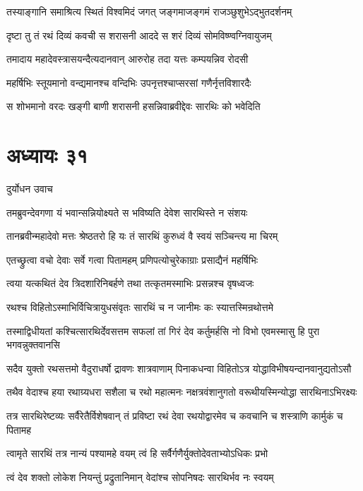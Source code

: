 \twolineshloka
{तस्याङ्गानि समाश्रित्य स्थितं विश्वमिदं जगत्}
{जङ्गमाजङ्गमं राजञ्छुशुभेऽद्भुतदर्शनम्}


\twolineshloka
{दृष्टा तु तं रथं दिव्यं कवची स शरासनी}
{आददे स शरं दिव्यं सोमविष्ण्वग्निवायुजम्}


\twolineshloka
{तमादाय महादेवस्त्रासयन्दैत्यदानवान्}
{आरुरोह तदा यत्तः कम्पयन्निव रोदसी}


\twolineshloka
{महर्षिभिः स्तूयमानो वन्द्यमानश्च वन्दिभिः}
{उपनृत्तश्चाप्सरसां गणैर्नृत्तविशारदैः}


\twolineshloka
{स शोभमानो वरदः खङ्गी बाणी शरासनी}
{हसन्निवाब्रवीद्देवः सारथिः को भवेदिति}


\chapter{अध्यायः ३१}
\twolineshloka
{दुर्योधन उवाच}
{}


\twolineshloka
{तमब्रुवन्देवगणा यं भवान्सन्नियोक्ष्यते}
{स भविष्यति देवेश सारथिस्ते न संशयः}


\twolineshloka
{तानब्रवीन्महादेवो मत्तः श्रेष्ठतरो हि यः}
{तं सारथिं कुरुध्वं वै स्वयं सञ्चिन्त्य मा चिरम्}


\twolineshloka
{एतच्छ्रुत्वा वचो देवाः सर्वे गत्वा पितामहम्}
{प्रणिपत्योचुरेकाग्राः प्रसाद्यैनं महर्षिभिः}


\twolineshloka
{त्वया यत्कथितं देव त्रिदशारिनिबर्हणे}
{तथा तत्कृतमस्माभिः प्रसन्नश्च वृषध्वजः}


\twolineshloka
{रथश्च विहितोऽस्माभिर्विचित्रायुधसंवृतः}
{सारथिं च न जानीमः कः स्यात्तस्मिन्रथोत्तमे}


\threelineshloka
{तस्माद्विधीयतां कश्चित्सारथिर्देवसत्तम}
{सफलां तां गिरं देव कर्तुमर्हसि नो विभो}
{एवमस्मासु हि पुरा भगवन्नुक्तवानसि}


\twolineshloka
{सदैव युक्तो रथसत्तमो वैदुराधर्षो द्रावणः शात्रवाणाम्}
{पिनाकधन्वा विहितोऽत्र योद्धाविभीषयन्दानवानुद्यतोऽसौ}


\twolineshloka
{तथैव वेदाश्च हया रथाग्र्यधरा सशैला च रथो महात्मनः}
{नक्षत्रवंशानुगतो वरूथीयस्मिन्योद्धा सारथिनाऽभिरक्ष्यः}


तत्र सारथिरेष्टव्यः सर्वैरेतैर्विशेषवान्
\twolineshloka
{तं प्रविष्टा रथं देवा रथयोद्वारमेव च}
{कवचानि च शस्त्राणि कार्मुकं च पितामह}


\twolineshloka
{त्वामृते सारथिं तत्र नान्यं पश्यामहे वयम्}
{त्वं हि सर्वैर्गणैर्युक्तोदेवताभ्योऽधिकः प्रभो}


\twolineshloka
{त्वं देव शक्तो लोकेश नियन्तुं प्रद्रुतानिमान्}
{वेदांश्च सोपनिषदः सारथिर्भव नः स्वयम्}


